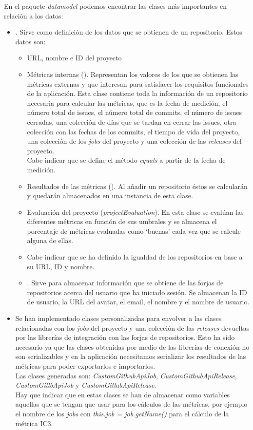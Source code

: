 En el paquete \textit{datamodel} podemos encontrar las clases más importantes en relación a los datos:
\begin{itemize}
	\item {}. Sirve como definición de los datos que se obtienen de un repositorio. Estos datos son:
	\begin{itemize}
		\item URL, nombre e ID del proyecto
		\item Métricas internas (). Representan los valores de los que se obtienen las métricas externas y que interesan para satisfacer los requisitos funcionales de la aplicación. Esta clase contiene toda la información de un repositorio necesaria para calcular las métricas, que es la fecha de medición, el número total de issues, el número total de commits, el número de issues cerradas, una colección de días que se tardan en cerrar las issues, otra colección con las fechas de los commits, el tiempo de vida del proyecto, una colección de los \textit{jobs} del proyecto y una colección de las \textit{releases} del proyecto.\\
		Cabe indicar que se define el método \textit{equals} a partir de la fecha de medición.
		\item Resultados de las métricas (). Al añadir un repositorio éstos se calcularán y quedarán almacenados en una instancia de esta clase.
		\item Evaluación del proyecto (\textit{projectEvaluation}). En esta clase se evalúan las diferentes métricas en función de sus umbrales y se almacena el porcentaje de métricas evaluadas como `buenas' cada vez que se calcule alguna de ellas.
		\item Cabe indicar que se ha definido la igualdad de los repositorios en base a su URL, ID y nombre.
	\item {}. Sirve para almacenar información que se obtiene de las forjas de repositorios acerca del usuario que ha iniciado sesión. Se almacenan la ID de usuario, la URL del avatar, el email, el nombre y el nombre de usuario.
	\end{itemize}
	\item Se han implementado clases personalizadas para envolver a las clases relacionadas con los \textit{jobs} del proyecto y una colección de las \textit{releases} devueltas por las librerías de integración con las forjas de repositorios. Esto ha sido necesario ya que las clases obtenidas por medio de las librerías de conexión no son serializables y en la aplicación necesitamos serializar los resultados de las métricas para poder exportarlos e importarlos.\\
	Las clases generadas son: \textit{CustomGithubApiJob}, \textit{CustomGithubApiRelease}, \textit{CustomGitlbApiJob} y \textit{CustomGitlabApiRelease}.\\
	Hay que indicar que en estas clases se han de almacenar como variables aquellas que se tengan que usar para los cálculos de las métricas, por ejemplo el nombre de los \textit{jobs} con \textit{this.job = job.getName()} para el cálculo de la métrica IC3.
\end{itemize}

